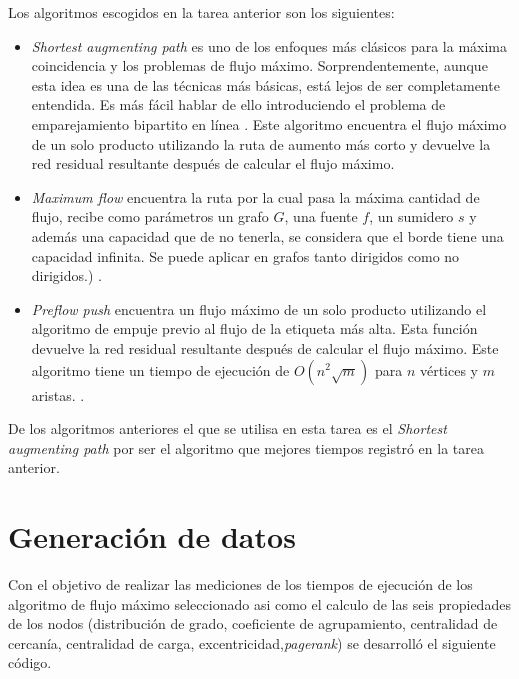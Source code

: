 \documentclass{article}
\begin{document}
Los algoritmos escogidos en la tarea anterior son los siguientes:
\begin{itemize}
  \item\textit{Shortest augmenting path} es uno de los enfoques más clásicos para la máxima coincidencia y los problemas de flujo máximo. Sorprendentemente, aunque esta idea es una de las técnicas más básicas, está lejos de ser completamente entendida. Es más fácil hablar de ello introduciendo el problema de emparejamiento bipartito en línea \cite{Bosek2018}. Este algoritmo encuentra el flujo máximo de un solo producto utilizando la ruta de aumento más corto y devuelve la red residual resultante después de calcular el flujo máximo.   
   \item\textit{Maximum flow} encuentra la ruta por la cual pasa la máxima cantidad de flujo, recibe como parámetros un grafo $G$, una fuente $f$, un sumidero $s$ y además una capacidad que de no tenerla, se considera que el borde tiene una capacidad infinita. Se puede aplicar en grafos tanto dirigidos como no dirigidos.) \cite{mf}.
	\item\textit{Preflow push} encuentra un flujo máximo de un solo producto utilizando el algoritmo de empuje previo al flujo de la etiqueta más alta. Esta función devuelve la red residual resultante después de calcular el flujo máximo. Este algoritmo tiene un tiempo de ejecución de $ O(n^{2}\sqrt{m})$ para $n$ vértices y $m$ aristas. \cite{gc}.
\end{itemize}

De los algoritmos anteriores el que se utilisa en esta tarea es el \textit{Shortest augmenting path} por ser el algoritmo que mejores tiempos registró en la tarea anterior.

\section{Generación de datos}
Con el objetivo de realizar las mediciones de los tiempos de ejecución de los algoritmo de flujo máximo seleccionado asi como el calculo de las seis propiedades de los nodos (distribución de grado, coeficiente de agrupamiento, centralidad de cercanía, centralidad de carga, excentricidad,\textit{pagerank}) se desarrolló el siguiente código.
\end{document}
